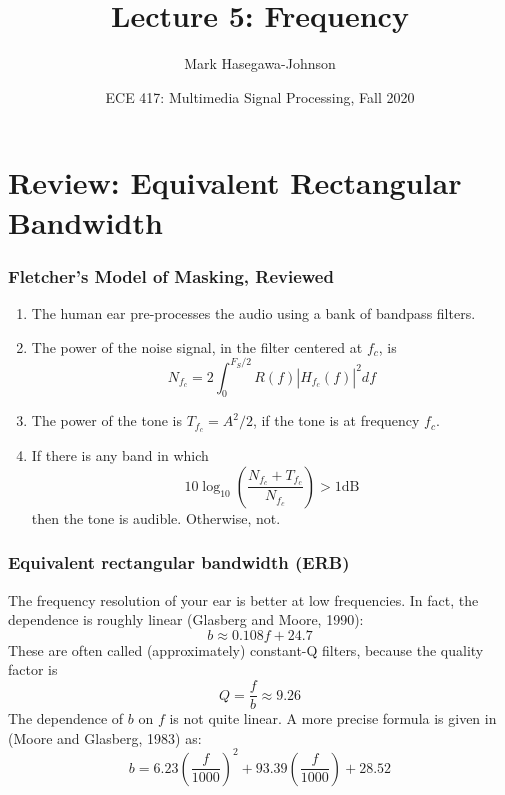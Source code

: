 \documentclass{beamer}
\title{Lecture 5: Frequency}
\author{Mark Hasegawa-Johnson}
\date{ECE 417: Multimedia Signal Processing, Fall 2020}
\begin{document}
\begin{frame}
  \maketitle
\end{frame}

\begin{frame}
  \tableofcontents
\end{frame}

\section[Review]{Review: Equivalent Rectangular Bandwidth}
\setcounter{subsection}{1}

\begin{frame}
  \frametitle{Fletcher's Model of Masking, Reviewed}

  \begin{enumerate}
  \item The human ear pre-processes  the audio using a bank of bandpass filters.
  \item The power of the noise signal, in the  filter centered at $f_c$, is
    \[
    N_{f_c}=2\int_{0}^{F_S/2} R(f) |H_{f_c}(f)|^2 df
    \]
  \item The power of the tone is $T_{f_c}=A^2/2$, if the tone is at frequency $f_c$.
  \item If there is any band in which
    \[
    10\log_{10}\left(\frac{N_{f_c}+T_{f_c}}{N_{f_c}}\right)>1\mbox{dB}
    \]
    then the tone is audible.  Otherwise, not.
  \end{enumerate}
\end{frame}

\begin{frame}
  \frametitle{Equivalent rectangular bandwidth (ERB)}

  The frequency resolution of your ear is better at low frequencies.
  In fact, the dependence is roughly linear (Glasberg and Moore,
  1990):
  \[
  b \approx 0.108 f + 24.7
  \]
  These are often called (approximately) constant-Q filters, because
  the quality factor is
  \[
  Q = \frac{f}{b} \approx 9.26
  \]
  The dependence of $b$ on $f$ is not quite linear.  A more precise
  formula is given in (Moore and Glasberg, 1983) as:
  \[
  b = 6.23\left(\frac{f}{1000}\right)^2 + 93.39\left(\frac{f}{1000}\right)+28.52
  \]
\end{frame}
\end{document}
